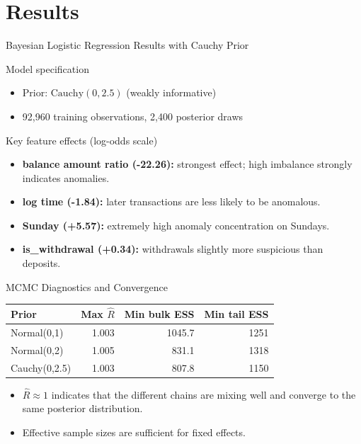 \documentclass[aspectratio=169,11pt]{beamer}
\begin{document}
\section{Results}
\begin{frame}{Bayesian Logistic Regression Results with Cauchy Prior}

\begin{block}{Model specification}
\begin{itemize}
  \item Prior: $\text{Cauchy}(0,2.5)$ (weakly informative)
  \item 92,960 training observations, 2,400 posterior draws
\end{itemize}
\end{block}

\begin{block}{Key feature effects (log-odds scale)}
\begin{itemize}
  \item \textbf{balance amount ratio (-22.26):} strongest effect; high imbalance strongly indicates anomalies.
  \item \textbf{log time (-1.84):} later transactions are less likely to be anomalous.
  \item \textbf{Sunday (+5.57):} extremely high anomaly concentration on Sundays.
  \item \textbf{is\_withdrawal (+0.34):} withdrawals slightly more suspicious than deposits.
\end{itemize}
\end{block}
\end{frame}

\begin{frame}{MCMC Diagnostics and Convergence}
  \begin{table}
    \centering
    \small
    \begin{tabular}{lrrr}
      \toprule
      \textbf{Prior} & \textbf{Max $\hat{R}$} & \textbf{Min bulk ESS} & \textbf{Min tail ESS} \\
      \midrule
      Normal(0,1) & 1.003 & 1045.7 & 1251 \\
      Normal(0,2) & 1.005 & 831.1 & 1318 \\
      Cauchy(0,2.5) & 1.003 & 807.8 & 1150 \\
      \bottomrule
    \end{tabular}
  \end{table}

  \begin{itemize}
    \item $\hat{R}\approx 1$ indicates that the different chains are mixing well and converge to the same posterior distribution.
    \item Effective sample sizes are sufficient for fixed effects.
  \end{itemize}
\end{frame}
\end{document}
